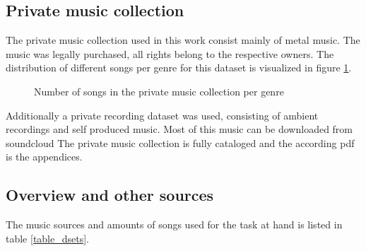 \subsection{Private music collection}

The private music collection used in this work consist mainly of metal music. The music was legally purchased, all rights belong to the respective owners. The distribution of different songs per genre for this dataset is visualized in figure \ref{privmusdist}.
\begin{figure}[thpb]
	\centering
	\caption{Number of songs in the private music collection per genre}
	\label{privmusdist}
\end{figure}
\FloatBarrier
Additionally a private recording dataset was used, consisting of ambient recordings and self produced music. Most of this music can be downloaded from soundcloud\cite{bqpd1}
The private music collection is fully cataloged and the according pdf is the appendices.

\subsection{Overview and other sources}

The music sources and amounts of songs used for the task at hand is listed in table \ref{table_dsets}.

